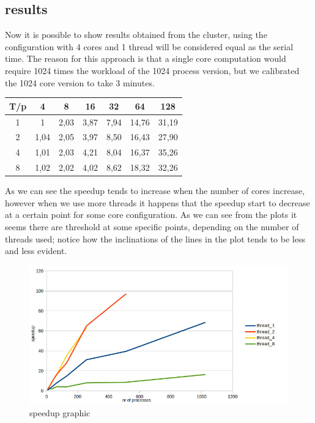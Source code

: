 \documentclass[10pt]{article}
\begin{document}
\begin{multicols}{2}
\subsection*{results}
\label{results}
Now it is possible to show results obtained from the cluster,
using the configuration with 4 cores and 1 thread will be considered
equal as the serial time. The reason for this approach is that a single core computation would require 1024 times the workload of the 1024 process version, but we calibrated the 1024 core version to take 3 minutes.


\begin{tabular}{| c | c | c | c | c | c | c |}
  \hline
  T/p & 4	 & 8	& 16	& 32	& 64 & 128  \\
  \hline
  1 & 1	& 2,03 & 3,87 & 7,94 & 14,76 & 31,19  \\
  2 & 1,04 & 2,05 & 3,97 & 8,50 & 16,43 & 27,90 \\	
  4 & 1,01 &2,03	& 4,21 &	8,04 &	16,37 &	35,26	\\	
  8 & 1,02  &2,02 &	4,02 &	8,62 &	18,32 &	32,26 \\
  \hline
\end{tabular}
\newline\newline As we can see the speedup tends to 
increase when the number of cores increase, however when
we use more threads it happens that the
speedup start to decrease at a certain point for some
core configuration. As we can see from the plots it 
seems there are threshold at some specific points, depending
on the number of threads used; notice how the inclinations
of the lines in the plot tends to be less and less evident.

\begin{figure}[H]
  \includegraphics[scale=0.3]{img/speedup.jpg}
  \centering
  \caption{speedup graphic}
\end{figure}


\end{multicols}
\end{document}
